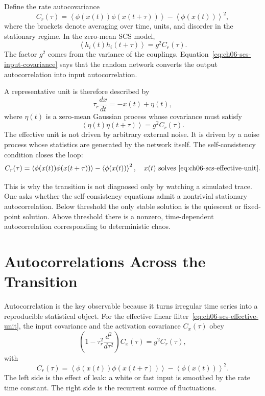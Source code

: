 Define the rate autocovariance
\[
        C_r(\tau)
        =
        \left\langle \phi(x(t))\phi(x(t+\tau))\right\rangle
        -
        \left\langle \phi(x(t))\right\rangle^2 ,
        \label{eq:ch06-rate-autocovariance}
\]
where the brackets denote averaging over time, units, and disorder in the
stationary regime. In the zero-mean SCS model,
\[
        \left\langle h_i(t)h_i(t+\tau)\right\rangle
        =
        g^2 C_r(\tau).
        \label{eq:ch06-scs-input-covariance}
\]
The factor \(g^2\) comes from the variance of the couplings.
Equation~\eqref{eq:ch06-scs-input-covariance} says that the random network converts the
output autocorrelation into input autocorrelation.

A representative unit is therefore described by
\[
        \tau_r \frac{d x}{dt} = -x(t) + \eta(t),
        \label{eq:ch06-scs-effective-unit}
\]
where \(\eta(t)\) is a zero-mean Gaussian process whose covariance must satisfy
\[
        \left\langle \eta(t)\eta(t+\tau)\right\rangle = g^2 C_r(\tau).
        \label{eq:ch06-effective-noise-covariance}
\]
The effective unit is not driven by arbitrary external noise. It is driven by a
noise process whose statistics are generated by the network itself. The
self-consistency condition closes the loop:
\[
        C_r(\tau)
        =
        \left\langle \phi(x(t))\phi(x(t+\tau))\right\rangle
        -
        \left\langle \phi(x(t))\right\rangle^2,
        \quad
        x(t)\ \hbox{solves}\ \eqref{eq:ch06-scs-effective-unit}.
        \label{eq:ch06-scs-self-consistency}
\]

This is why the transition is not diagnosed only by watching a simulated trace.
One asks whether the self-consistency equations admit a nontrivial stationary
autocorrelation. Below threshold the only stable solution is the quiescent or
fixed-point solution. Above threshold there is a nonzero, time-dependent
autocorrelation corresponding to deterministic chaos.

\section{Autocorrelations Across the Transition}
\label{sec:ch06-autocorrelation-transition}

Autocorrelation is the key observable because it turns irregular time series
into a reproducible statistical object. For the effective linear
filter~\eqref{eq:ch06-scs-effective-unit}, the input covariance and the activation
covariance \(C_x(\tau)\) obey
\[
        \left(1-\tau_r^2\frac{d^2}{d\tau^2}\right)C_x(\tau)
        =
        g^2 C_r(\tau),
        \label{eq:ch06-autocorrelation-filter}
\]
with
\[
        C_r(\tau)
        =
        \left\langle \phi(x(t))\phi(x(t+\tau))\right\rangle
        -
        \left\langle \phi(x(t))\right\rangle^2 .
\]
The left side is the effect of leak: a white or fast input is smoothed by the
rate time constant. The right side is the recurrent source of fluctuations.

